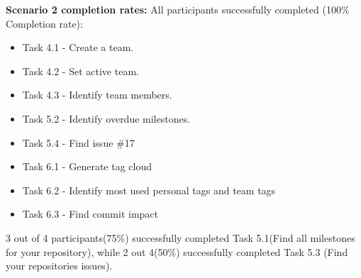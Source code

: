 \textbf{Scenario 2 completion rates:}
All participants successfully completed (100\% Completion rate):
\begin{itemize}
	\item Task 4.1 - Create a team. 
	\item Task 4.2 - Set active team. 
	\item Task 4.3 - Identify team members. 
	\item Task 5.2 - Identify overdue milestones. 
	\item Task 5.4 - Find issue \#17
	\item Task 6.1 - Generate tag cloud
	\item Task 6.2 - Identify most used personal tags and team tags
	\item Task 6.3 - Find commit impact
\end{itemize}
3 out of 4 participants(75\%) successfully completed Task 5.1(Find all milestones for your repository), while 2 out 4(50\%) successfully completed Task 5.3 (Find your repositories issues). 

